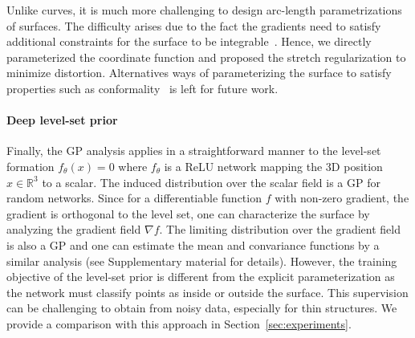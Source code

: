Unlike curves, it is much more challenging to design arc-length parametrizations of surfaces. 
The difficulty arises due to the fact the gradients need to satisfy additional constraints for the surface to be
integrable~\cite{sussmann1973orbits}. 
Hence, we directly parameterized the coordinate function and proposed the stretch regularization to minimize distortion.
Alternatives ways of parameterizing the surface to satisfy properties such as conformality~\cite{nehari2012conformal} is left for future work.

\paragraph*{Deep level-set prior} Finally, the GP analysis applies in a straightforward manner to the level-set formation $f_\theta(x) = 0$ where $f_\theta$ is a ReLU network 
mapping the 3D position $x \in \mathbb{R}^3$ to a scalar. The induced distribution over the
scalar field is a GP for random networks. Since for a differentiable function $f$ with non-zero gradient, the gradient is orthogonal to the level set, one can characterize the surface by analyzing the gradient field $\nabla f$. The limiting distribution over the gradient field is also a GP and one can estimate the mean and convariance functions by a similar analysis (see Supplementary material for details).
However, the training objective of the level-set prior is different from the explicit parameterization as the network must classify points as inside or outside the surface. This supervision can be challenging to obtain from noisy
data, especially for thin structures. We provide a comparison with this
approach in Section~\ref{sec:experiments}. 




